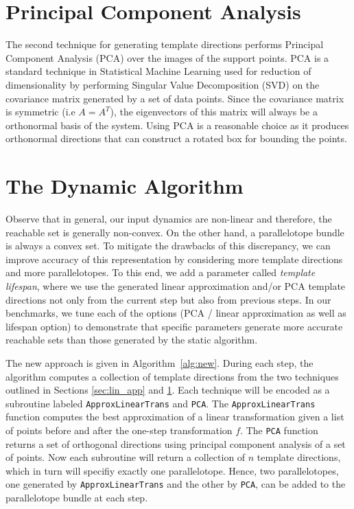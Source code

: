 \section{Principal Component Analysis}
\label{sec:pca}
The second technique for generating template directions performs Principal Component Analysis (PCA) over the images of the support points.
%
PCA is a standard technique in Statistical Machine Learning used for reduction of dimensionality by performing Singular Value Decomposition (SVD) on the covariance matrix generated by a set of data points.
%
Since the covariance matrix is symmetric (i.e $A = A^T$), the eigenvectors of this matrix will always be a orthonormal basis of the system.
%
Using PCA is a reasonable choice as it produces orthonormal directions that can construct a rotated box for bounding the points.
%


\section{The Dynamic Algorithm}
\label{sec:dyna_algo}
Observe that in general, our input dynamics are non-linear and therefore, the reachable set is generally non-convex.
%
On the other hand, a parallelotope bundle is always a convex set.
%
To mitigate the drawbacks of this discrepancy, we can improve accuracy of this representation by considering more template directions and more parallelotopes.
%
To this end, we add a parameter called \emph{template lifespan}, where we use the generated linear approximation and/or PCA template directions not only from the current step but also from previous steps.
%
 In our benchmarks, we tune each of the options (PCA / linear approximation as well as lifespan option) to demonstrate that specific parameters generate more accurate reachable sets than those generated by the static algorithm.

The new approach is given in Algorithm~\ref{alg:new}.
%
During each step, the algorithm computes a collection of template directions from the two techniques outlined in Sections \ref{sec:lin_app} and \ref{sec:pca}. Each technique will be encoded as a subroutine labeled \texttt{ApproxLinearTrans} and \texttt{PCA}.
%
The \texttt{ApproxLinearTrans} function computes the best approximation of a linear transformation given a list of points before and after the one-step transformation $f$.
%
The \texttt{PCA} function returns a set of orthogonal directions using principal component analysis of a set of points.
%
Now each subroutine will return a collection of $n$ template directions, which in turn will specifiy exactly one parallelotope.
%
Hence, two parallelotopes, one generated by \texttt{ApproxLinearTrans} and the other by \texttt{PCA}, can be added to the parallelotope bundle at each step.
%

